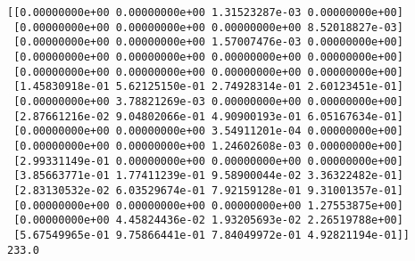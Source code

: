 \documentclass[11pt]{article}
\begin{document}
    \begin{Verbatim}[commandchars=\\\{\}]
[[0.00000000e+00 0.00000000e+00 1.31523287e-03 0.00000000e+00]
 [0.00000000e+00 0.00000000e+00 0.00000000e+00 8.52018827e-03]
 [0.00000000e+00 0.00000000e+00 1.57007476e-03 0.00000000e+00]
 [0.00000000e+00 0.00000000e+00 0.00000000e+00 0.00000000e+00]
 [0.00000000e+00 0.00000000e+00 0.00000000e+00 0.00000000e+00]
 [1.45830918e-01 5.62125150e-01 2.74928314e-01 2.60123451e-01]
 [0.00000000e+00 3.78821269e-03 0.00000000e+00 0.00000000e+00]
 [2.87661216e-02 9.04802066e-01 4.90900193e-01 6.05167634e-01]
 [0.00000000e+00 0.00000000e+00 3.54911201e-04 0.00000000e+00]
 [0.00000000e+00 0.00000000e+00 1.24602608e-03 0.00000000e+00]
 [2.99331149e-01 0.00000000e+00 0.00000000e+00 0.00000000e+00]
 [3.85663771e-01 1.77411239e-01 9.58900044e-02 3.36322482e-01]
 [2.83130532e-02 6.03529674e-01 7.92159128e-01 9.31001357e-01]
 [0.00000000e+00 0.00000000e+00 0.00000000e+00 1.27553875e+00]
 [0.00000000e+00 4.45824436e-02 1.93205693e-02 2.26519788e+00]
 [5.67549965e-01 9.75866441e-01 7.84049972e-01 4.92821194e-01]]
233.0
    \end{Verbatim}
\end{document}
